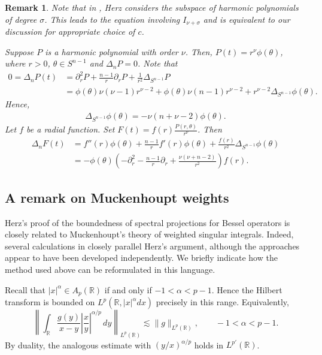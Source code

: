 \documentclass[12pt]{amsart}
\newtheorem{remark}[theorem]{Remark}
\begin{document}
\begin{remark}
Note that in \cite{Herz}, Herz considers the subspace of harmonic polynomials of degree $\sigma$. This leads to the equation involving 
$I_{\nu+\sigma}$ and is equivalent to our discussion for appropriate choice of $c$. 

Suppose $P$ is a harmonic polynomial with order $\nu$. Then, $P(t) = r^\nu \phi(\theta)$, where $r>0$, $\theta \in S^{n-1}$ and $\Delta_n P = 0$. Note that
\begin{align*}
    0 = \Delta_n P(t) &= \partial_r^2 P + \frac{n-1}{r}\partial_r P + \frac{1}{r^2}\Delta_{S^{n-1}}P\\
    &= \phi(\theta) \nu(\nu-1) r^{\nu-2} + \phi(\theta) \nu(n-1) r^{\nu-2} + r^{\nu-2} \Delta_{S^{n-1}}\phi(\theta).
\end{align*}
Hence,
\begin{align*}
    \Delta_{S^{n-1}}\phi(\theta) = - \nu(n+\nu-2)\phi(\theta).
\end{align*}
Let $f$ be a radial function. Set $F(t) = f(r)\frac{P(r,\theta)}{r^\nu}$. Then
\begin{align*}
    \Delta_n F(t) &= f''(r) \phi(\theta) + \frac{n-1}{r} f'(r) \phi(\theta) + \frac{f(r)}{r^2} \Delta_{S^{n-1}}\phi(\theta)\\
    &= - \phi(\theta) \left(-\partial_r^2 - \frac{n-1}{r}\partial_r + \frac{\nu(\nu+n-2)}{r^2}\right)f(r).
\end{align*}

\end{remark}

\subsection{A remark on Muckenhoupt weights}

Herz's proof of the boundedness of spectral projections for Bessel
operators is closely related to Muckenhoupt's theory of weighted singular
integrals. Indeed, several calculations in \cite{Muck1,Muck2,Muckenhoupt}
closely parallel Herz's argument, although the approaches appear to have
been developed independently. We briefly indicate how the method used
above can be reformulated in this language.

Recall that $|x|^\alpha\in A_p(\mathbb R)$ if and only if
$-1<\alpha<p-1$. Hence the Hilbert transform is bounded on
$L^p(\mathbb R,|x|^\alpha dx)$ precisely in this range. Equivalently,
\[
\left\|
\int_{\mathbb R}
\frac{g(y)}{x-y}
\left|\frac{x}{y}\right|^{\alpha/p}\,dy
\right\|_{L^p(\mathbb R)}
\lesssim
\|g\|_{L^p(\mathbb R)},
\qquad -1<\alpha<p-1.
\]
By duality, the analogous estimate with $(y/x)^{\alpha/p}$ holds in
$L^{p'}(\mathbb R)$.
\end{document}
